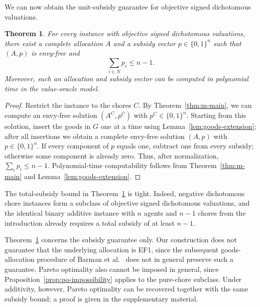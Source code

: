 \documentclass[sigconf,anonymous]{aamas}
\theoremstyle{acmplain}
\newtheorem{theorem}{Theorem}[section]
\theoremstyle{acmdefinition}
\theoremstyle{acmplain}
\begin{document}
We can now obtain the unit-subsidy guarantee for objective signed dichotomous valuations.

\begin{theorem}
\label{thm:objective-mixed}
For every instance with objective signed dichotomous valuations, there exist a complete allocation $A$ and a subsidy vector $p\in\{0,1\}^n$ such that $(A,p)$ is envy-free and
\[
\sum_{i\in N} p_i\leq n-1.
\]
Moreover, such an allocation and subsidy vector can be computed in polynomial time in the value-oracle model.
\end{theorem}

\begin{proof}
Restrict the instance to the chores $C$. By Theorem~\ref{thm:m-main}, we can compute an envy-free solution $(A^C,p^C)$ with $p^C\in\{0,1\}^n$. Starting from this solution, insert the goods in $G$ one at a time using Lemma~\ref{lem:goods-extension}; after all insertions we obtain a complete envy-free solution $(A,p)$ with $p\in\{0,1\}^n$. If every component of $p$ equals one, subtract one from every subsidy; otherwise some component is already zero. Thus, after normalization, $\sum_i p_i\le n-1$. Polynomial-time computability follows from Theorem~\ref{thm:m-main} and Lemma~\ref{lem:goods-extension}.
\end{proof}

The total-subsidy bound in Theorem~\ref{thm:objective-mixed} is tight. Indeed, negative dichotomous chore instances form a subclass of objective signed dichotomous valuations, and the identical binary additive instance with $n$ agents and $n-1$ chores from the introduction already requires a total subsidy of at least $n-1$.

Theorem~\ref{thm:objective-mixed} concerns the subsidy guarantee only. Our construction does not guarantee that the underlying allocation is EF1, since the subsequent goods-allocation procedure of Barman et al.~\cite{BKNS22} does not in general preserve such a guarantee. Pareto optimality also cannot be imposed in general, since Proposition~\ref{prop:po-impossibility} applies to the pure-chore subclass. Under additivity, however, Pareto optimality can be recovered together with the same subsidy bound; a proof is given in the supplementary material.







\end{document}
